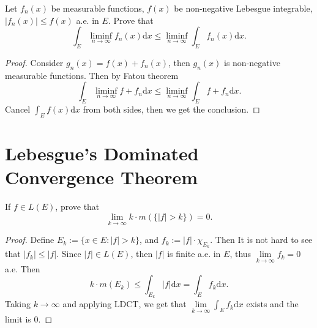 \begin{exercise}{}{}
  Let $f_n(x)$ be measurable functions, $f(x)$ be non-negative Lebesgue integrable,
  $|f_n(x)| \leq f(x)$ a.e. in $E$. Prove that
  \begin{equation}
    \int_E \liminf_{n \rightarrow \infty} f_n(x) \mathrm{d} x \leq \liminf _{n \rightarrow \infty} \int_E f_n(x)\mathrm{d} x.
  \end{equation}
\end{exercise}

\begin{proof}
  Consider $g_n(x) = f(x) + f_n(x)$, then $g_n(x)$ is non-negative measurable functions.
  Then by Fatou theorem
  \begin{equation}
    \int_E \liminf_{n \rightarrow \infty} f + f_n \mathrm{d} x
    \leq \liminf_{n \rightarrow \infty} \int_E f + f_n \mathrm{d} x.
  \end{equation}
  Cancel $\int_E f(x)\mathrm{d} x$ from both sides, then we get the conclusion.
\end{proof}



\section{Lebesgue's Dominated Convergence Theorem}

\begin{exercise}{}{}
  If $f \in L(E)$, prove that
  \begin{equation}
    \lim \limits _{k \rightarrow \infty} k \cdot m(\{|f| > k\}) = 0.
  \end{equation}
\end{exercise}

\begin{proof}
  Define $E_k := \{x \in E: |f| > k\}$, and $f_k := |f| \cdot \chi_{E_k}$.
  Then It is not hard to see that $|f_k| \leq |f|$.
  Since $|f| \in L(E)$, then $|f|$ is finite a.e. in $E$,
  thus $\lim \limits _{k \rightarrow \infty} f_k = 0$ a.e.
  Then
  \begin{equation}
    k \cdot m(E_k) \leq \int_{E_k} |f| \mathrm{d} x = \int_E f_k \mathrm{d} x.
  \end{equation}
  Taking $k \rightarrow \infty$ and applying LDCT,
  we get that $\lim \limits _{k \rightarrow \infty} \int_E f_k \mathrm{d} x$ exists and the limit is $0$.
\end{proof}





